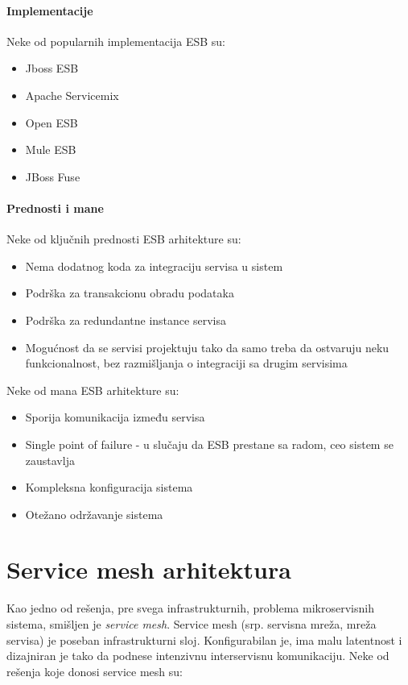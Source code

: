 \documentclass[a4paper,12pt]{report}
\begin{document}
\subsubsection{Implementacije}

Neke od popularnih implementacija ESB su: 
 
\begin{itemize}
	\item Jboss ESB
	\item Apache Servicemix
	\item Open ESB
	\item Mule ESB
	\item JBoss Fuse
\end{itemize}

\subsubsection{Prednosti i mane}

Neke od ključnih prednosti ESB arhitekture su: 

\begin{itemize}
	\item Nema dodatnog koda za integraciju servisa u sistem
	\item Podrška za transakcionu obradu podataka
	\item Podrška za redundantne instance servisa
	\item Mogućnost da se servisi projektuju tako da samo treba da ostvaruju neku funkcionalnost, bez razmišljanja o integraciji sa drugim servisima
\end{itemize}

Neke od mana ESB arhitekture su: 

\begin{itemize}
	\item Sporija komunikacija između servisa
	\item Single point of failure - u slučaju da ESB prestane sa radom, ceo sistem se zaustavlja
	\item Kompleksna konfiguracija sistema
	\item Otežano održavanje sistema
\end{itemize}


\chapter{Service mesh arhitektura}

Kao jedno od rešenja, pre svega infrastrukturnih, problema mikroservisnih sistema, smišljen je \textit{service mesh}. Service mesh (srp. servisna mreža, mreža servisa) je poseban infrastrukturni sloj. Konfigurabilan je, ima malu latentnost i dizajniran je tako da podnese intenzivnu interservisnu komunikaciju. Neke od rešenja koje donosi service mesh su: 
\end{document}
